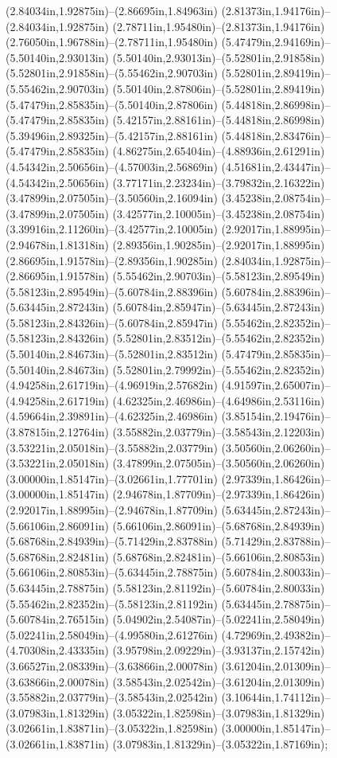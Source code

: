 (2.84034in,1.92875in)--(2.86695in,1.84963in) (2.81373in,1.94176in)--(2.84034in,1.92875in) (2.78711in,1.95480in)--(2.81373in,1.94176in) (2.76050in,1.96788in)--(2.78711in,1.95480in) (5.47479in,2.94169in)--(5.50140in,2.93013in) (5.50140in,2.93013in)--(5.52801in,2.91858in) (5.52801in,2.91858in)--(5.55462in,2.90703in) (5.52801in,2.89419in)--(5.55462in,2.90703in) (5.50140in,2.87806in)--(5.52801in,2.89419in) (5.47479in,2.85835in)--(5.50140in,2.87806in) (5.44818in,2.86998in)--(5.47479in,2.85835in) (5.42157in,2.88161in)--(5.44818in,2.86998in) (5.39496in,2.89325in)--(5.42157in,2.88161in) (5.44818in,2.83476in)--(5.47479in,2.85835in) (4.86275in,2.65404in)--(4.88936in,2.61291in) (4.54342in,2.50656in)--(4.57003in,2.56869in) (4.51681in,2.43447in)--(4.54342in,2.50656in) (3.77171in,2.23234in)--(3.79832in,2.16322in) (3.47899in,2.07505in)--(3.50560in,2.16094in) (3.45238in,2.08754in)--(3.47899in,2.07505in) (3.42577in,2.10005in)--(3.45238in,2.08754in) (3.39916in,2.11260in)--(3.42577in,2.10005in) (2.92017in,1.88995in)--(2.94678in,1.81318in) (2.89356in,1.90285in)--(2.92017in,1.88995in) (2.86695in,1.91578in)--(2.89356in,1.90285in) (2.84034in,1.92875in)--(2.86695in,1.91578in) (5.55462in,2.90703in)--(5.58123in,2.89549in) (5.58123in,2.89549in)--(5.60784in,2.88396in) (5.60784in,2.88396in)--(5.63445in,2.87243in) (5.60784in,2.85947in)--(5.63445in,2.87243in) (5.58123in,2.84326in)--(5.60784in,2.85947in) (5.55462in,2.82352in)--(5.58123in,2.84326in) (5.52801in,2.83512in)--(5.55462in,2.82352in) (5.50140in,2.84673in)--(5.52801in,2.83512in) (5.47479in,2.85835in)--(5.50140in,2.84673in) (5.52801in,2.79992in)--(5.55462in,2.82352in) (4.94258in,2.61719in)--(4.96919in,2.57682in) (4.91597in,2.65007in)--(4.94258in,2.61719in) (4.62325in,2.46986in)--(4.64986in,2.53116in) (4.59664in,2.39891in)--(4.62325in,2.46986in) (3.85154in,2.19476in)--(3.87815in,2.12764in) (3.55882in,2.03779in)--(3.58543in,2.12203in) (3.53221in,2.05018in)--(3.55882in,2.03779in) (3.50560in,2.06260in)--(3.53221in,2.05018in) (3.47899in,2.07505in)--(3.50560in,2.06260in) (3.00000in,1.85147in)--(3.02661in,1.77701in) (2.97339in,1.86426in)--(3.00000in,1.85147in) (2.94678in,1.87709in)--(2.97339in,1.86426in) (2.92017in,1.88995in)--(2.94678in,1.87709in) (5.63445in,2.87243in)--(5.66106in,2.86091in) (5.66106in,2.86091in)--(5.68768in,2.84939in) (5.68768in,2.84939in)--(5.71429in,2.83788in) (5.71429in,2.83788in)--(5.68768in,2.82481in) (5.68768in,2.82481in)--(5.66106in,2.80853in) (5.66106in,2.80853in)--(5.63445in,2.78875in) (5.60784in,2.80033in)--(5.63445in,2.78875in) (5.58123in,2.81192in)--(5.60784in,2.80033in) (5.55462in,2.82352in)--(5.58123in,2.81192in) (5.63445in,2.78875in)--(5.60784in,2.76515in) (5.04902in,2.54087in)--(5.02241in,2.58049in) (5.02241in,2.58049in)--(4.99580in,2.61276in) (4.72969in,2.49382in)--(4.70308in,2.43335in) (3.95798in,2.09229in)--(3.93137in,2.15742in) (3.66527in,2.08339in)--(3.63866in,2.00078in) (3.61204in,2.01309in)--(3.63866in,2.00078in) (3.58543in,2.02542in)--(3.61204in,2.01309in) (3.55882in,2.03779in)--(3.58543in,2.02542in) (3.10644in,1.74112in)--(3.07983in,1.81329in) (3.05322in,1.82598in)--(3.07983in,1.81329in) (3.02661in,1.83871in)--(3.05322in,1.82598in) (3.00000in,1.85147in)--(3.02661in,1.83871in) (3.07983in,1.81329in)--(3.05322in,1.87169in);
